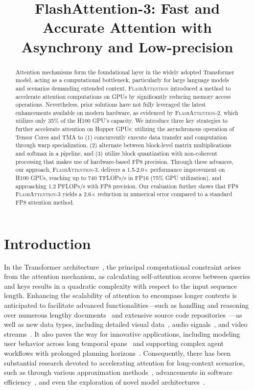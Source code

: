 \title{FlashAttention-3: Fast and Accurate Attention with Asynchrony and Low-precision}

\begin{abstract}
Attention mechanisms form the foundational layer in the widely adopted Transformer model, acting as a computational bottleneck, particularly for large language models and scenarios demanding extended context. \textsc{FlashAttention} introduced a method to accelerate attention computations on GPUs by significantly reducing memory access operations. Nevertheless, prior solutions have not fully leveraged the latest enhancements available on modern hardware, as evidenced by \textsc{FlashAttention-2}, which utilizes only 35\% of the H100 GPU’s capacity. We introduce three key strategies to further accelerate attention on Hopper GPUs: utilizing the asynchronous operation of Tensor Cores and TMA to (1) concurrently execute data transfer and computation through warp specialization, (2) alternate between block-level matrix multiplications and softmax in a pipeline, and (3) utilize block quantization with non-coherent processing that makes use of hardware-based FP8 precision. Through these advances, our approach, \textsc{FlashAttention-3}, delivers a 1.5-2.0$\times$ performance improvement on H100 GPUs, reaching up to 740 TFLOPs/s in FP16 (75\% GPU utilization), and approaching 1.2 PFLOPs/s with FP8 precision. Our evaluation further shows that FP8 \textsc{FlashAttention-3} yields a 2.6$\times$ reduction in numerical error compared to a standard FP8 attention method.
\end{abstract}

\section{Introduction}
\label{sec:intro}

In the Transformer architecture~\citep{vaswani2017attention}, the principal computational constraint arises from the attention mechanism, as calculating self-attention scores between queries and keys results in a quadratic complexity with respect to the input sequence length. Enhancing the scalability of attention to encompass longer contexts is anticipated to facilitate advanced functionalities—such as handling and reasoning over numerous lengthy documents~\citep{guo2021longt5,shaham2022scrolls,peng2023yarn} and extensive source code repositories~\citep{roziere2023code, li2023starcoder}—as well as new data types, including detailed visual data~\citep{chen2022scaling}, audio signals~\citep{gulati2020conformer}, and video streams~\citep{ho2022video}. It also paves the way for innovative applications, including modeling user behavior across long temporal spans~\citep{sun2019bert4rec} and supporting complex agent workflows with prolonged planning horizons~\citep{yao2022react}. Consequently, there has been substantial research devoted to accelerating attention for long-context scenarios, such as through various approximation methods~\citep{katharopoulos2020transformers,choromanski2020rethinking,tay2020efficient}, advancements in software efficiency~\citep{rabe2021self,dao2022flashattention,kwon2023efficient}, and even the exploration of novel model architectures~\citep{peng2023rwkv,sun2023retentive,gu2023mamba}.

